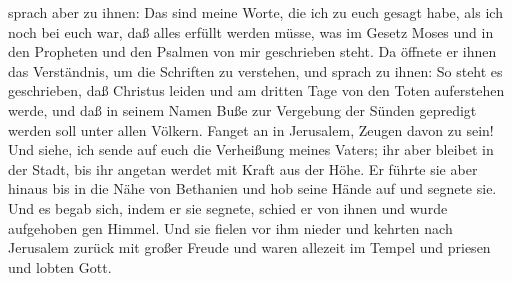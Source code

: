 sprach aber zu ihnen: Das sind meine Worte, die ich zu euch gesagt habe,
als ich noch bei euch war, daß alles erfüllt werden müsse, was im Gesetz
Moses und in den Propheten und den Psalmen von mir geschrieben steht.
 Da öffnete er ihnen das Verständnis, um die Schriften zu
verstehen,  und sprach zu ihnen: So steht es geschrieben,
daß Christus leiden und am dritten Tage von den Toten auferstehen werde,
 und daß in seinem Namen Buße zur Vergebung der Sünden
gepredigt werden soll unter allen Völkern.  Fanget an in
Jerusalem, Zeugen davon zu sein!  Und siehe, ich sende
auf euch die Verheißung meines Vaters; ihr aber bleibet in der Stadt,
bis ihr angetan werdet mit Kraft aus der Höhe.  Er führte
sie aber hinaus bis in die Nähe von Bethanien und hob seine Hände auf
und segnete sie.  Und es begab sich, indem er sie
segnete, schied er von ihnen und wurde aufgehoben gen Himmel.
 Und sie fielen vor ihm nieder und kehrten nach Jerusalem
zurück mit großer Freude  und waren allezeit im Tempel
und priesen und lobten Gott.
